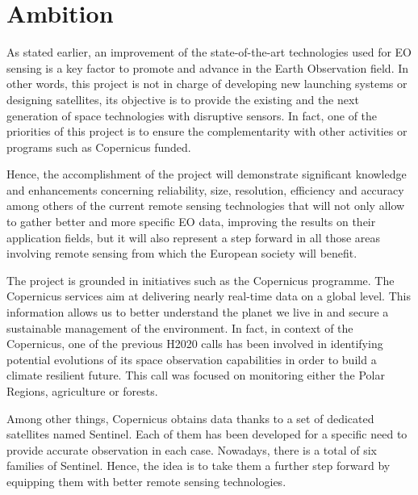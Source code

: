 \section{Ambition}



As stated earlier, an improvement of the state-of-the-art technologies used for EO sensing is a key factor to promote and advance in the Earth Observation field. In other words, this project is not in charge of developing new launching systems or designing satellites, its objective is to provide the existing and the next generation of space technologies with disruptive sensors. In fact, one of the priorities of this project is to ensure the complementarity with other activities or programs such as Copernicus funded.

Hence, the accomplishment of the project will demonstrate significant knowledge and enhancements concerning reliability, size, resolution, efficiency and accuracy among others of the current remote sensing technologies that will not only allow to gather better and more specific EO data, improving the results on their application fields, but it will also represent a step forward in all those areas involving remote sensing from which the European society will benefit. 

The project is grounded in initiatives such as the Copernicus programme. The Copernicus services aim at delivering nearly real-time data on a global level. This information allows us to better understand the planet we live in and secure a sustainable management of the environment. In fact, in context of the Copernicus, one of the previous H2020 calls has been involved in identifying potential evolutions of its space observation capabilities in order to build a climate resilient future. This call was focused on monitoring either the Polar Regions, agriculture or forests.

Among other things, Copernicus obtains data thanks to a set of dedicated satellites named Sentinel. Each of them has been developed for a specific need to provide accurate observation in each case. Nowadays, there is a total of six families of Sentinel. Hence, the idea is to take them a further step forward by equipping them with better remote sensing technologies. 